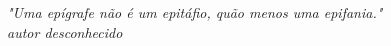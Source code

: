\renewcommand{\epigraphname}{EPÍGRAFE}

\begin{epigrafe}[EPÍGRAFE]

\textit{"Uma epígrafe não é um epitáfio, quão menos uma epifania." 
\\ autor desconhecido}

\end{epigrafe}

